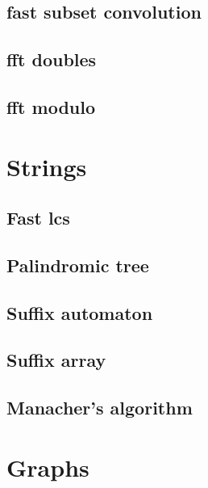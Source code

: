 \subsection{fast subset convolution}
\raggedbottom
\hrulefill
\subsection{fft doubles}
\raggedbottom
\hrulefill
\subsection{fft modulo}
\raggedbottom
\hrulefill

\section{Strings}
\subsection{Fast lcs}
\raggedbottom
\hrulefill
\subsection{Palindromic tree}
\raggedbottom
\hrulefill
\subsection{Suffix automaton}
\raggedbottom
\hrulefill
\subsection{Suffix array}
\raggedbottom
\hrulefill
\subsection{Manacher's algorithm}
\raggedbottom
\hrulefill

\section{Graphs}
